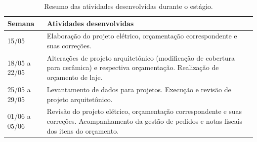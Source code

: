 \begin{table}[htb]
    \centering
    \caption{\label{tab:resumo_atividades} Resumo das atividades desenvolvidas durante o estágio.}

    \begin{tabularx}{\textwidth}{ l X }
        \hline
        \textbf{Semana} & \textbf{Atividades desenvolvidas} \\ \hline
        15/05 &  Elaboração do projeto elétrico, orçamentação correspondente e suas correções. \\ 

        18/05 a 22/05 & Alterações de projeto arquitetônico (modificação de cobertura para cerâmica) e respectiva orçamentação. Realização de orçamento de laje. \\ 

        25/05 a 29/05 & Levantamento de dados para projetos. Execução e revisão de projeto arquitetônico. \\ 

        01/06 a 05/06 & Revisão do projeto elétrico, orçamentação correspondente e suas correções. Acompanhamento da gestão de pedidos e notas fiscais dos itens do orçamento. \\ 
        \hline
    \end{tabularx}
    
    \vspace{1em}
\end{table}